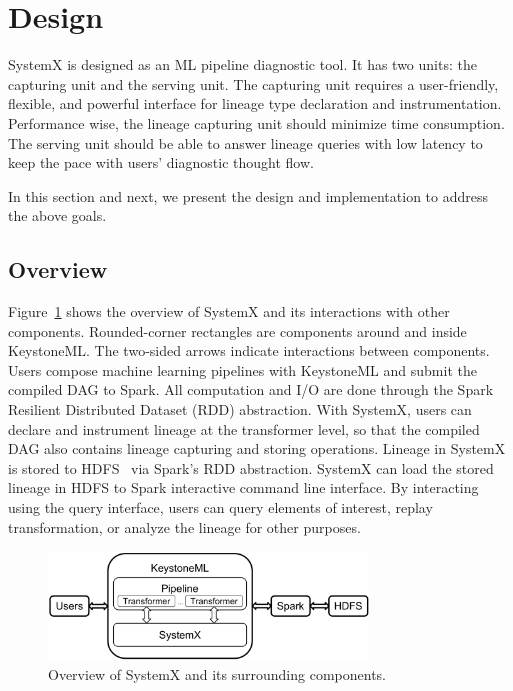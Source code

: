 \documentclass{sig-alternate}
\begin{document}
\section{Design}
\label{sec:Design}
SystemX is designed as an ML pipeline diagnostic tool. 
It has two units: the capturing unit and the serving unit.
The capturing unit requires a user-friendly, flexible, and powerful interface for lineage type declaration and instrumentation.
Performance wise, the lineage capturing unit should minimize time consumption.
The serving unit should be able to answer lineage queries with low latency to keep the pace with users' diagnostic thought flow.

In this section and next, we present the design and implementation to address the above goals.

\subsection{Overview}
Figure~\ref{fig:architecture} shows the overview of SystemX and its interactions with other components. 
Rounded-corner rectangles are components around and inside KeystoneML. 
The two-sided arrows indicate interactions between components.
Users compose machine learning pipelines with KeystoneML and submit the compiled DAG to Spark.
All computation and I/O are done through the Spark Resilient Distributed Dataset (RDD) abstraction.
With SystemX, users can declare and instrument lineage at the transformer level, 
so that the compiled DAG also contains lineage capturing and storing operations.
Lineage in SystemX is stored to HDFS~\cite{shvachko10} via Spark's RDD abstraction.
SystemX can load the stored lineage in HDFS to Spark interactive command line interface.
By interacting using the query interface, users can query elements of interest, replay transformation, or analyze
the lineage for other purposes.

\begin{figure}[h]
\begin{center}
    \includegraphics[width=85mm]{pictures/architecture}
\caption {Overview of SystemX and its surrounding components.
    \label{fig:architecture}
}
\end{center}
\end{figure}
\end{document}
